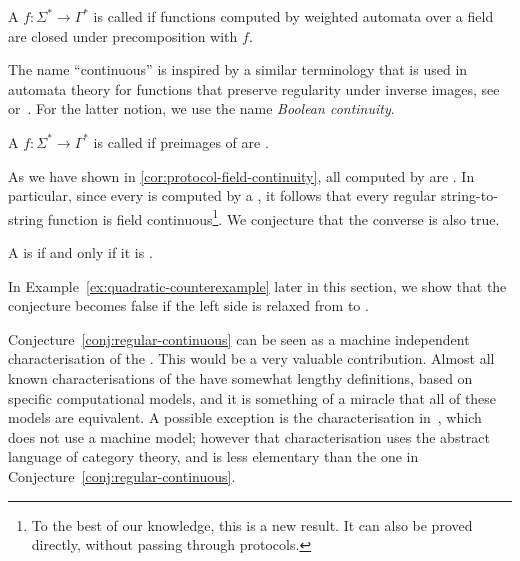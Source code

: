 \begin{definition}
    \label{def:weighted-continuity}
    \AP
    A  $f : \Sigma^* \to \Gamma^*$ is called
     if functions computed by weighted automata over a
    field are closed under precomposition with $f$.
\end{definition}

The name ``continuous'' is inspired by a
similar terminology that is used in automata theory for functions that preserve
regularity under inverse images, see~\cite[Theorem 4.1]{PinSilva05}
or~\cite[Footnote 2]{continuity20}. For the latter notion, we use the name
\emph{Boolean continuity}.

\begin{definition}
  \AP
  A  $f : \Sigma^* \to \Gamma^*$ is called
   if preimages of  are .
\end{definition}

As we have shown in \cref{cor:protocol-field-continuity}, all
 computed by  are . In
particular, since every  is computed by a
, it follows that every regular string-to-string function is field
continuous\footnote{To the best of our knowledge, this is a new result. It can
also be proved directly, without passing through protocols.}. We
conjecture that the converse is also true.

\begin{conjecture}\label{conj:regular-continuous}
  A  is  if and only if it is 
  .
\end{conjecture}

In Example~\ref{ex:quadratic-counterexample} later in this section,  we show that the conjecture becomes false if the
left side is relaxed from  to .

Conjecture~\ref{conj:regular-continuous} can be seen as a machine independent
characterisation of the . This would be
a very valuable contribution. Almost all known characterisations of the
 have somewhat lengthy definitions,
based on specific computational models, and it is something of a miracle that
all of these models are equivalent. A possible exception is the
characterisation in~\cite{bojanczykTitoRegular23}, which does not use a machine
model; however that characterisation uses the abstract language of category
theory, and is less elementary than the one in
Conjecture~\ref{conj:regular-continuous}.

